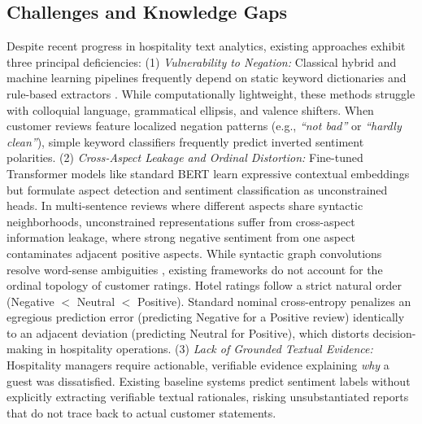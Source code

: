 \documentclass{llncs}
\begin{document}
\subsection{Challenges and Knowledge Gaps}
\label{subsec:problem}
Despite recent progress in hospitality text analytics, existing approaches exhibit three principal deficiencies:
(1) \textit{Vulnerability to Negation:} Classical hybrid and machine learning pipelines frequently depend on static keyword dictionaries and rule-based extractors \cite{ref04_namee2023}. While computationally lightweight, these methods struggle with colloquial language, grammatical ellipsis, and valence shifters. When customer reviews feature localized negation patterns (e.g., \textit{``not bad''} or \textit{``hardly clean''}), simple keyword classifiers frequently predict inverted sentiment polarities.
(2) \textit{Cross-Aspect Leakage and Ordinal Distortion:} Fine-tuned Transformer models like standard BERT \cite{ref01_bimaputra2023} learn expressive contextual embeddings but formulate aspect detection and sentiment classification as unconstrained heads. In multi-sentence reviews where different aspects share syntactic neighborhoods, unconstrained representations suffer from cross-aspect information leakage, where strong negative sentiment from one aspect contaminates adjacent positive aspects. While syntactic graph convolutions resolve word-sense ambiguities \cite{ref09_nadeem2025}, existing frameworks do not account for the ordinal topology of customer ratings. Hotel ratings follow a strict natural order (Negative $<$ Neutral $<$ Positive). Standard nominal cross-entropy penalizes an egregious prediction error (predicting Negative for a Positive review) identically to an adjacent deviation (predicting Neutral for Positive), which distorts decision-making in hospitality operations.
(3) \textit{Lack of Grounded Textual Evidence:} Hospitality managers require actionable, verifiable evidence explaining \textit{why} a guest was dissatisfied. Existing baseline systems \cite{ref01_bimaputra2023,ref04_namee2023,ref09_nadeem2025} predict sentiment labels without explicitly extracting verifiable textual rationales, risking unsubstantiated reports that do not trace back to actual customer statements.
\end{document}
